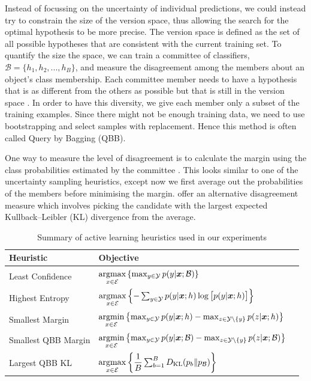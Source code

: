 \documentclass[fleqn,10pt,lineno]{wlpeerj} %
\newcommand{\B}{\mathcal{B}}
\newcommand{\Y}{\mathcal{Y}}
\newcommand{\Ecal}{\mathcal{E}}
\newcommand*{\argmin}{\operatornamewithlimits{argmin}\limits}
\newcommand*{\argmax}{\operatornamewithlimits{argmax}\limits}
\begin{document}
Instead of focussing on the uncertainty of individual predictions, we could
instead try to constrain the size of the version space, thus allowing the
search for the optimal hypothesis to be more precise. The version space is
defined as the set of all possible hypotheses that are consistent with the
current training set. To quantify the size the space, we can train a committee
of classifiers, $\B = \{h_1, h_2, ..., h_B\}$, and measure the disagreement
among the members about an object's class membership. Each committee member
needs to have a hypothesis that is as different from the others as possible but
that is still in the version space \citep{melville04}. In order to have this
diversity, we give each member only a subset of the training examples. Since
there might not be enough training data, we need to use bootstrapping and
select samples with replacement. Hence this method is often called Query by
Bagging (QBB).

One way to measure the level of disagreement is to calculate the margin using
the class probabilities estimated by the committee \citep{melville04}. This
looks similar to one of the uncertainty sampling heuristics, except now we
first average out the probabilities of the members before minimising the
margin. \cite{mccallum98} offer an alternative disagreement measure which
involves picking the candidate with the largest expected Kullback--Leibler (KL)
divergence from the average.


\begin{table}[h]
	\caption {Summary of active learning heuristics used in our experiments} \label{tab:heuristics}
	\centering
	\begin{tabular}{lll}
		\toprule
		{Heuristic}  &  Objective  \\
		\midrule
        Least Confidence &
			$\argmax_{x \in \Ecal} \left\{ \max_{y \in \Y} p(y | \bm{x}; \B) \right\}$
			\\
		Highest Entropy &
			$\argmax_{x \in \Ecal} \left\{-\sum_{y \in \Y} p(y | \bm{x}; h)
            \log \big[ p(y | \bm{x}; h) \big] \right\}$
			\\[2ex]
		Smallest Margin &
			$\argmin_{x \in \Ecal} \left\{ \max_{y \in \Y} p(y | \bm{x}; h) -
            \max_{z \in \Y \setminus \{y\}} p(z | \bm{x}; h)  \right\}$
			\\[2ex]
		Smallest QBB Margin &
			$\argmin_{x \in \Ecal} \left\{ \max_{y \in \Y} p(y | \bm{x}; \B) -
            \max_{z \in \Y \setminus \{y\}} p(z | \bm{x}; \B)  \right\}$
			\\[2ex]
		Largest QBB KL &
			$\argmax_{x \in \Ecal} \left\{ \dfrac{1}{B}
               \sum_{b=1}^B D_{\mathrm{KL}}(p_b\|p_\B) \right\}$
			\\
		\bottomrule
	\end{tabular}
\end{table}
\end{document}
